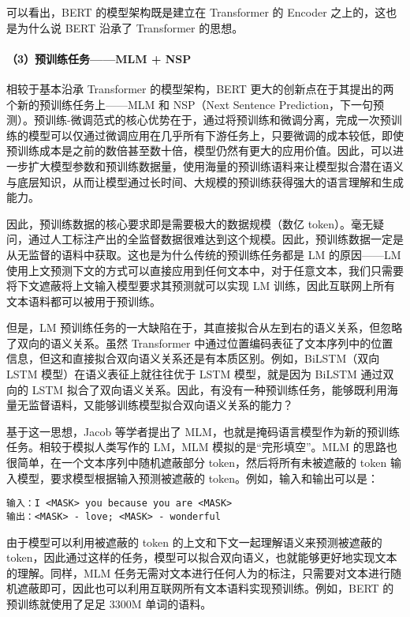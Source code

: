 \documentclass[12pt,a4paper]{book}
\begin{document}
可以看出，BERT 的模型架构既是建立在 Transformer 的 Encoder
之上的，这也是为什么说 BERT 沿承了 Transformer 的思想。

\paragraph{（3）预训练任务------MLM +
NSP}\label{ux9884ux8badux7ec3ux4efbux52a1mlm-nsp}

相较于基本沿承 Transformer 的模型架构，BERT
更大的创新点在于其提出的两个新的预训练任务上------MLM 和 NSP（Next
Sentence
Prediction，下一句预测）。预训练-微调范式的核心优势在于，通过将预训练和微调分离，完成一次预训练的模型可以仅通过微调应用在几乎所有下游任务上，只要微调的成本较低，即使预训练成本是之前的数倍甚至数十倍，模型仍然有更大的应用价值。因此，可以进一步扩大模型参数和预训练数据量，使用海量的预训练语料来让模型拟合潜在语义与底层知识，从而让模型通过长时间、大规模的预训练获得强大的语言理解和生成能力。

因此，预训练数据的核心要求即是需要极大的数据规模（数亿
token）。毫无疑问，通过人工标注产出的全监督数据很难达到这个规模。因此，预训练数据一定是从无监督的语料中获取。这也是为什么传统的预训练任务都是
LM 的原因------LM
使用上文预测下文的方式可以直接应用到任何文本中，对于任意文本，我们只需要将下文遮蔽将上文输入模型要求其预测就可以实现
LM 训练，因此互联网上所有文本语料都可以被用于预训练。

但是，LM
预训练任务的一大缺陷在于，其直接拟合从左到右的语义关系，但忽略了双向的语义关系。虽然
Transformer
中通过位置编码表征了文本序列中的位置信息，但这和直接拟合双向语义关系还是有本质区别。例如，BiLSTM（双向
LSTM 模型）在语义表征上就往往优于 LSTM 模型，就是因为 BiLSTM 通过双向的
LSTM
拟合了双向语义关系。因此，有没有一种预训练任务，能够既利用海量无监督语料，又能够训练模型拟合双向语义关系的能力？

基于这一思想，Jacob 等学者提出了
MLM，也就是掩码语言模型作为新的预训练任务。相较于模拟人类写作的 LM，MLM
模拟的是``完形填空''。MLM 的思路也很简单，在一个文本序列中随机遮蔽部分
token，然后将所有未被遮蔽的 token 输入模型，要求模型根据输入预测被遮蔽的
token。例如，输入和输出可以是：

\begin{verbatim}
输入：I <MASK> you because you are <MASK>
输出：<MASK> - love; <MASK> - wonderful
\end{verbatim}

由于模型可以利用被遮蔽的 token 的上文和下文一起理解语义来预测被遮蔽的
token，因此通过这样的任务，模型可以拟合双向语义，也就能够更好地实现文本的理解。同样，MLM
任务无需对文本进行任何人为的标注，只需要对文本进行随机遮蔽即可，因此也可以利用互联网所有文本语料实现预训练。例如，BERT
的预训练就使用了足足 3300M 单词的语料。
\end{document}
